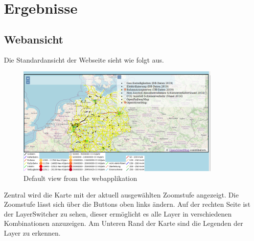 \section{Ergebnisse}

\subsection{Webansicht}
Die Standardansicht der Webseite sieht wie folgt aus. 
\begin{figure}[h]
\centering
	\includegraphics[width=0.9\textwidth]{images/defaultview.png}
	\caption{Default view from the webapplikation}
\end{figure}
Zentral wird die Karte mit der aktuell ausgewählten Zoomstufe angezeigt. Die Zoomstufe lässt sich über die Buttons oben links ändern. Auf der rechten Seite ist der LayerSwitcher zu sehen, dieser ermöglicht es alle Layer in verschiedenen Kombinationen anzuzeigen. Am Unteren Rand der Karte sind die Legenden der Layer zu erkennen.
\pagebreak
